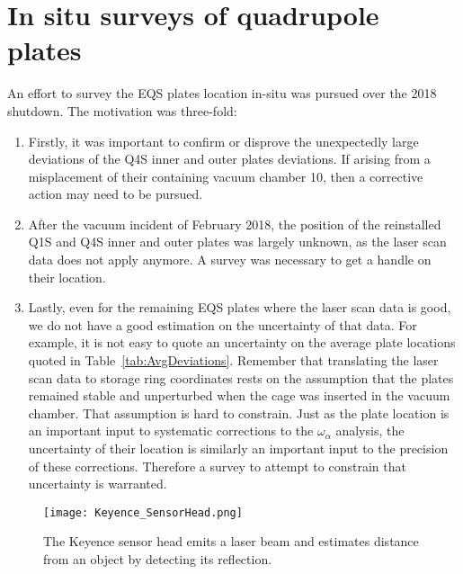 \section{\label{sec:insitu_surveys} In situ surveys of quadrupole plates }
\medskip


An effort to survey the EQS plates location in-situ was pursued over the 2018 shutdown.
The motivation was three-fold:
\begin{enumerate}
\item Firstly, it was important to confirm or disprove the unexpectedly large deviations of the Q4S inner and outer plates deviations. If arising from a misplacement of their containing vacuum chamber 10, then a corrective action may need to be pursued.
\item After the vacuum incident of February 2018, the position of the reinstalled Q1S and Q4S inner and outer plates was largely unknown, as the laser scan data does not apply anymore. A survey was necessary to get a handle on their location.
\item Lastly, even for the remaining EQS plates where the laser scan data is good, we do not have a good estimation on the uncertainty of that data. For example, it is not easy to quote an uncertainty on the average plate locations quoted in Table~\ref{tab:AvgDeviations}. 
Remember that translating the laser scan data to storage ring coordinates rests on the assumption that the plates remained stable and unperturbed when the cage was inserted in the vacuum chamber. That assumption is hard to constrain. Just as the plate location is an important input to systematic corrections to the $\omega_\alpha$ analysis, the uncertainty of their location is similarly an important input to the precision of these corrections. Therefore a survey to attempt to constrain that uncertainty is warranted.
\end{enumerate}



\begin{wrapfigure}{r}{0.6\textwidth}
	\centering
	\texttt{[image: Keyence\_SensorHead.png]}
	\caption{The Keyence sensor head emits a laser beam and estimates distance from an object by detecting its reflection.
	}\label{fig:Keyence_SensorHead}
\end{wrapfigure}


